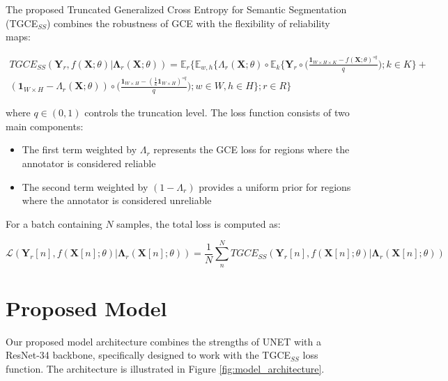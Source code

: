 The proposed Truncated Generalized Cross Entropy for Semantic
Segmentation (TGCE$_{SS}$) combines the robustness of GCE with the
flexibility of reliability maps:

\begin{equation}
  \begin{split}
    TGCE_{SS}(\mathbf{Y}_r,f(\mathbf X;\theta) | \mathbf{\Lambda}_r
    (\mathbf X;\theta)) = \mathbb E_{r} \Bigg\{ \mathbb E_{w,h}
      \Bigg\{ \Lambda_r (\mathbf X; \theta) \circ \mathbb E_k \bigg\{
          \mathbf Y_r \circ \bigg( \frac{\mathbf 1 _{W\times H \times
        K} - f(\mathbf X;\theta) ^{\circ q }}{q} \bigg); k \in K  \bigg\}  + \\
        \left(\mathbf 1 _{W \times H } - \Lambda _r (\mathbf
        X;\theta)\right) \circ \bigg(   \frac{\mathbf 1_{W\times H} -
        (\frac {1}{k} \mathbf 1_{W\times H})^{\circ q}}{q} \bigg); w \in
    W, h \in H \Bigg\};r\in R\Bigg\}
  \end{split}
\end{equation}

where $q \in (0,1)$ controls the truncation level. The loss function
consists of two main components:

\begin{itemize}
  \item The first term weighted by $\Lambda_r$ represents the GCE
    loss for regions where the annotator is considered reliable
  \item The second term weighted by $(1-\Lambda_r)$ provides a
    uniform prior for regions where the annotator is considered unreliable
\end{itemize}

For a batch containing $N$ samples, the total loss is computed as:

\begin{equation}
  \mathscr{L}\left(\mathbf{Y}_r[n],f(\mathbf X[n];\theta) |
  \mathbf{\Lambda}_r (\mathbf X[n];\theta)\right)  = \frac{1}{N}
  \sum_{n}^NTGCE_{SS}(\mathbf{Y}_r[n],f(\mathbf X[n];\theta) |
  \mathbf{\Lambda}_r (\mathbf X[n];\theta))
\end{equation}

\section{Proposed Model}

Our proposed model architecture combines the strengths of UNET with a
ResNet-34 backbone, specifically designed to work with the
TGCE$_{SS}$ loss function. The architecture is illustrated in Figure
\ref{fig:model_architecture}.

